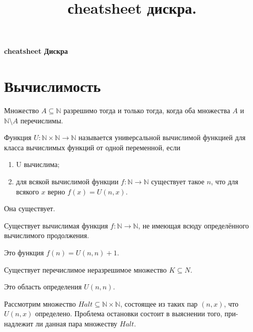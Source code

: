 \documentclass{article}
\title{сheatsheet дискра.}
\newcommand{\N}{\mathbb{N}}
\newenvironment{theorem}[2][Теорема]{\begin{trivlist}
\item[\hskip \labelsep {\bfseries #1}\hskip \labelsep {\bfseries #2.}]}{\end{trivlist}}
\newenvironment{definition}[2][Определение]{\begin{trivlist}
\item[\hskip \labelsep {\bfseries #1}\hskip \labelsep {\bfseries #2}]}{\end{trivlist}}
\begin{document}
{\center \textbf{\LARGE cheatsheet Дискра}}

\section{Вычислимость}
\begin{theorem}{Поста}
Множество $A \subseteq \N$ разрешимо тогда и только
тогда, когда оба множества $A$ и $\N \setminus A$ перечислимы.
\end{theorem}

\begin{definition}{Универсальная вычислимая функция.}
Функция  $U : \N \times \N \to \N$ называется универсальной вычислимой
функцией для класса вычислимых функций от одной переменной, если
\begin{enumerate}
  \item U вычислима;
  \item для всякой вычислимой функции $f : \N \to \N$ существует такое $n$, что для всякого $x$ верно $f(x) = U(n, x)$.
\end{enumerate}

Она существует.
\end{definition}

\begin{theorem}{Функция без всюду
определённого вычислимого продолжения}
Существует вычислимая функция $f : \N \to \N$, не имеющая всюду
определённого вычислимого продолжения.

Это функция $f(n) = U(n, n) + 1$.
\end{theorem}

\begin{theorem}{Перечислимое неразрешимое множество}
Существует перечислимое неразрешимое множество $K \subseteq N$.

Это область определения $U(n, n)$.
\end{theorem}

\begin{definition}{Проблема остановки}
Рассмотрим множество $Halt \subseteq \N \times \N$, состоящее из таких пар
$(n, x)$, что $U(n, x)$ определено. Проблема остановки состоит в выяснении того, при-
надлежит ли данная пара множеству $Halt$.
\end{definition}
\end{document}
